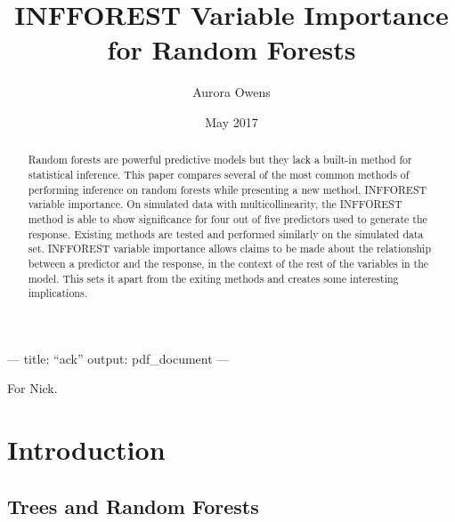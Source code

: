 \documentclass[12pt,twoside]{reedthesis}
\title{INFFOREST Variable Importance for Random Forests}
\author{Aurora Owens}
\date{May 2017}
\begin{document}
      \maketitle
  
  \frontmatter %
  \pagestyle{empty} %

      \begin{acknowledgements}
      --- title: ``ack'' output: pdf\_document ---
    \end{acknowledgements}
  
  
      \hypersetup{linkcolor=black}
    \setcounter{tocdepth}{2}
    \tableofcontents
  
      \listoftables
  
      \listoffigures
  
      \begin{abstract}
      Random forests are powerful predictive models but they lack a built-in
      method for statistical inference. This paper compares several of the
      most common methods of performing inference on random forests while
      presenting a new method, INFFOREST variable importance. On simulated
      data with multicollinearity, the INFFOREST method is able to show
      significance for four out of five predictors used to generate the
      response. Existing methods are tested and performed similarly on the
      simulated data set. INFFOREST variable importance allows claims to be
      made about the relationship between a predictor and the response, in the
      context of the rest of the variables in the model. This sets it apart
      from the exiting methods and creates some interesting implications.\par
    \end{abstract}
  
      \begin{dedication}
      For Nick.
    \end{dedication}
  
  \mainmatter %
  \pagestyle{fancyplain} %

  \chapter{Introduction}\label{introduction}
  
  \section{Trees and Random Forests}\label{trees-and-random-forests}
  
\end{document}
